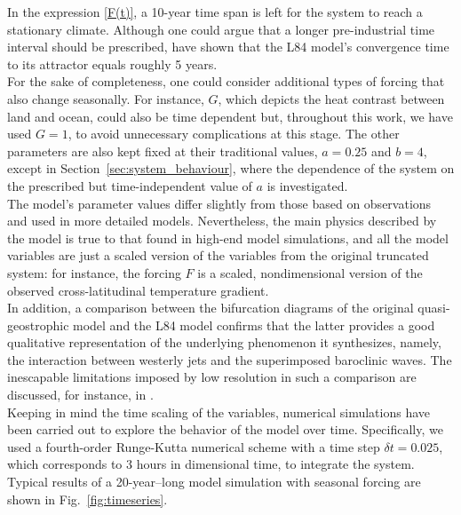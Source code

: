 \documentclass[%
 aip, cha,
 amsmath,amssymb,
 reprint,%
author-year,%
]{revtex4-1}
\newcommand{\0}{\mathbf 0}
\begin{document}
In the expression \eqref{F(t)}, a 10-year time span is left for the system to reach a stationary climate. Although one could argue that a longer pre-industrial time interval should be prescribed, \cite{drotos} have shown that the L84 model's convergence time to its attractor equals roughly 5 years.\\ 
For the sake of completeness, one could consider additional types of forcing that also change seasonally. For instance, $G$, which depicts the heat contrast between land and ocean, could also be time dependent but, throughout this work, we have used $G=1$, to avoid unnecessary complications at this stage.
The other parameters are also kept fixed at their traditional values, $a = 0.25$ and $b = 4$, except in Section~\ref{sec:system_behaviour}, where the dependence of the system on the prescribed but time-independent value of $a$ is investigated. \\
The model's parameter values differ slightly from those based on observations and used in more detailed models. Nevertheless, the main physics described by the model is true to that found in high-end model simulations, and all the model variables are just a scaled version of the variables from the original truncated system: for instance, the forcing $F$ is a scaled, nondimensional version of the observed cross-latitudinal temperature gradient. \\
In addition, a comparison between the bifurcation diagrams of the original quasi-geostrophic model and the L84 model %
confirms that the latter provides a good qualitative representation of the underlying phenomenon it synthesizes, namely, the interaction between westerly jets and the superimposed baroclinic waves. The inescapable limitations imposed by low resolution in such a comparison are discussed, for instance, in \citet[Sec.~5.3]{Ghil.Chil.1987}. \\
Keeping in mind the time scaling of the variables, numerical simulations have been carried out to explore the behavior of the model over time. Specifically, we used a fourth-order Runge-Kutta numerical scheme with a time step $\delta t = 0.025$, which corresponds to 3 hours in dimensional time, to integrate the system. Typical results of a 20-year--long model simulation with seasonal forcing are shown in Fig.~\ref{fig:timeseries}.
\end{document}
